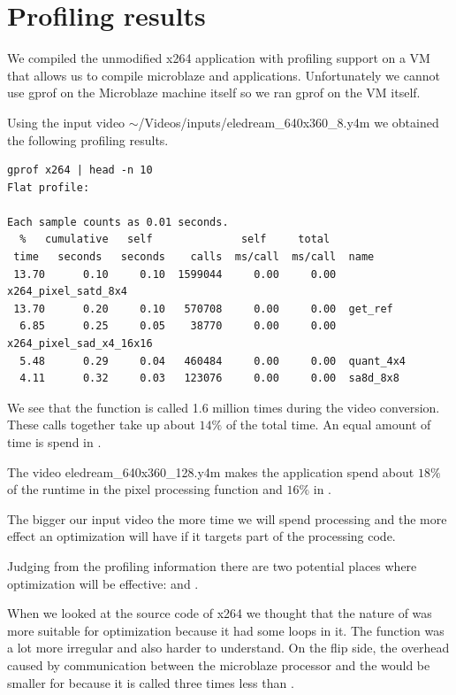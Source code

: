 \documentclass{article}
\begin{document}
\section{Profiling results}

We compiled the unmodified x264 application with profiling support on a VM that
allows us to compile microblaze and \rvex{} applications. Unfortunately we
cannot use gprof on the Microblaze machine itself so we ran gprof on the VM
itself.

	Using the input video $\sim$/Videos/inputs/eledream\_640x360\_8.y4m we obtained
the following profiling results.

\begin{small}\begin{lstlisting}
gprof x264 | head -n 10
Flat profile:

Each sample counts as 0.01 seconds.
  %   cumulative   self              self     total
 time   seconds   seconds    calls  ms/call  ms/call  name
 13.70      0.10     0.10  1599044     0.00     0.00  x264_pixel_satd_8x4
 13.70      0.20     0.10   570708     0.00     0.00  get_ref
  6.85      0.25     0.05    38770     0.00     0.00  x264_pixel_sad_x4_16x16
  5.48      0.29     0.04   460484     0.00     0.00  quant_4x4
  4.11      0.32     0.03   123076     0.00     0.00  sa8d_8x8
\end{lstlisting}\end{small}

We see that the function \satd{} is called 1.6 million times during the video
conversion. These calls together take up about $14\%$ of the total time. An
equal amount of time is spend in \satd{}.

The video eledream\_640x360\_128.y4m makes the application spend about $18\%$
of the runtime in the pixel processing function and $16\%$ in \getref{}.

The bigger our input video the more time we will spend processing and the more
effect an optimization will have if it targets part of the processing code.

Judging from the profiling information there are two potential places where
optimization will be effective: \satd{} and \getref{}.

When we looked at the source code of x264 we thought that the nature of \satd{}
was more suitable for optimization because it had some loops in it. The
\getref{} function was a lot more irregular and also harder to understand. On
the flip side, the overhead caused by communication between the microblaze
processor and the \rvex{} would be smaller for \getref{} because it is called
three times less than \satd{}.
\end{document}
